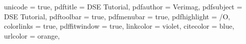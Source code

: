 
\usepackage[utf8]{inputenc}
\usepackage[T1]{fontenc}







\usepackage[titletoc]{appendix}

\usepackage{csquotes}

\usepackage[sorting=anyt,sortcites=true,backend=biber,url=false,doi=false,maxnames=7,isbn=false,firstinits=true,style=numeric]{biblatex}
% 




\usepackage[english]{babel}

\usepackage{braket}
\usepackage{amsmath,amssymb,mathtools,amsthm}
\usepackage{nicefrac}
\usepackage{stmaryrd}
\usepackage{xfrac}


\usepackage{algorithm2e}
\SetAlFnt{\small}

\usepackage{hyperref}
\hypersetup
{
  unicode         = true,
  pdftitle        = DSE Tutorial,
  pdfauthor       = Verimag, %
  pdfsubject      = DSE Tutorial,
  pdftoolbar      = true, %
  pdfmenubar      = true, %
  pdfhighlight    = /O, %
  colorlinks      = true, %
  pdffitwindow    = true, %
  linkcolor       = violet, %
  citecolor       = blue, %
  urlcolor        = orange, %
}

